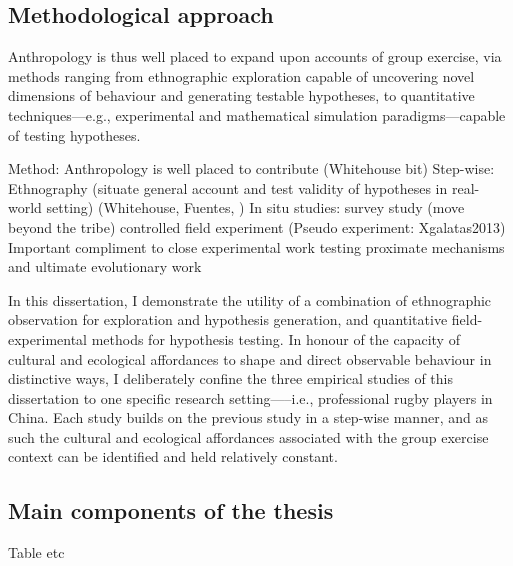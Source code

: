\begin{CJK}{UTF8}{gbsn}
\subsection{Methodological approach}

Anthropology is thus well placed to expand upon accounts of group exercise, via methods ranging from ethnographic exploration capable of uncovering novel dimensions of behaviour and generating testable hypotheses, to quantitative techniques---e.g., experimental and mathematical simulation paradigms---capable of testing hypotheses.

Method: Anthropology is well placed to contribute (Whitehouse bit)
  Step-wise:
  Ethnography (situate general account and test validity of hypotheses in real-world setting) (Whitehouse, Fuentes, )
  In situ studies:
   survey study (move beyond the tribe)
   controlled field experiment (Pseudo experiment: Xgalatas2013)
Important compliment to close experimental work testing proximate mechanisms and ultimate evolutionary work


In this dissertation, I demonstrate the utility of a combination of ethnographic observation for exploration and hypothesis generation, and quantitative field-experimental methods for hypothesis testing. In honour of the capacity of cultural and ecological affordances to shape and direct observable behaviour in distinctive ways, I deliberately confine the three empirical studies of this dissertation to one specific research setting—--i.e., professional rugby players in China.
Each study builds on the previous study in a step-wise manner, and as such the cultural and ecological affordances associated with the group exercise context can be identified and held relatively constant.




\subsection{Main components of the thesis}

Table etc







\end{CJK}
